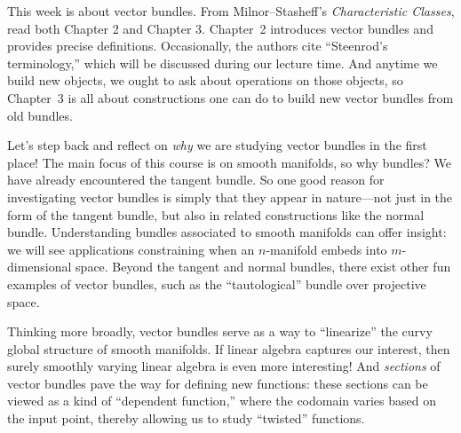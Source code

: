 \documentclass{homework}
\author{Jim Fowler}
\date{Week 2: Vector bundles}
\begin{document}
\maketitle

This week is about vector bundles.  From Milnor--Stasheff's
\textit{Characteristic Classes}, read both Chapter 2 and Chapter 3.
Chapter~2 introduces vector bundles and provides precise
definitions. Occasionally, the authors cite ``Steenrod's
terminology,'' which will be discussed during our lecture time.  And
anytime we build new objects, we ought to ask about operations on
those objects, so Chapter~3 is all about constructions one can do to
build new vector bundles from old bundles.

Let's step back and reflect on \textit{why} we are studying vector
bundles in the first place! The main focus of this course is on smooth
manifolds, so why bundles?  We have already encountered the tangent
bundle. So one good reason for investigating vector bundles is simply
that they appear in nature---not just in the form of the tangent
bundle, but also in related constructions like the normal
bundle. Understanding bundles associated to smooth manifolds can offer
insight: we will see applications constraining when an
\( n \)-manifold embeds into \( m \)-dimensional space.  Beyond the
tangent and normal bundles, there exist other fun examples of vector
bundles, such as the ``tautological'' bundle over projective space.

Thinking more broadly, vector bundles serve as a way to ``linearize''
the curvy global structure of smooth manifolds. If linear algebra
captures our interest, then surely smoothly varying linear algebra is
even more interesting!  And \textit{sections} of vector bundles pave
the way for defining new functions: these sections can be viewed as a
kind of ``dependent function,'' where the codomain varies based on the
input point, thereby allowing us to study ``twisted'' functions.
\end{document}
